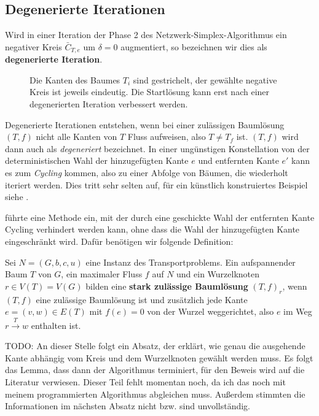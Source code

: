 \subsection{Degenerierte Iterationen}\label{ch:deg}

\begin{defn}Wird in einer Iteration der Phase 2 des Netzwerk-Simplex-Algorithmus ein negativer Kreis $\bar{C}_{T,e}$ um $\delta=0$ augmentiert, so bezeichnen wir dies als \textbf{degenerierte Iteration}.
\end{defn}

\begin{figure}[!ht]\centering
	
	\caption{Die Kanten des Baumes $T_i$ sind gestrichelt, der gewählte negative Kreis ist jeweils eindeutig. Die Startlösung kann erst nach einer degenerierten Iteration verbessert werden.}
	\label{fig:deg}
\end{figure}

Degenerierte Iterationen entstehen, wenn bei einer zulässigen Baumlösung $(T,f)$ nicht alle Kanten von $T$ Fluss aufweisen, also $T\neq T_f$ ist. $(T,f)$ wird dann auch als \emph{degeneriert} bezeichnet. In einer ungünstigen Konstellation von der deterministischen Wahl der hinzugefügten Kante $e$ und entfernten Kante $e'$ kann es zum \emph{Cycling} kommen, also zu einer Abfolge von Bäumen, die wiederholt iteriert werden. Dies tritt sehr selten auf, für ein künstlich konstruiertes Beispiel siehe \cite[S. 303]{NSAbook}.

\cite[Cunningham, 1976]{cycling} führte eine Methode ein, mit der durch eine geschickte Wahl der entfernten Kante Cycling verhindert werden kann, ohne dass die Wahl der hinzugefügten Kante eingeschränkt wird. Dafür benötigen wir folgende Definition:

\begin{defn}Sei $N=(G,b,c,u)$ eine Instanz des Transportproblems. Ein aufspannender Baum $T$ von $G$, ein maximaler Fluss $f$ auf $N$ und ein Wurzelknoten $r\in V(T)=V(G)$ bilden eine \textbf{stark zulässige Baumlösung} $(T,f)_r$, wenn $(T,f)$ eine zulässige Baumlösung ist und zusätzlich jede Kante $e=(v,w)\in E(T)$ mit $f(e)=0$ von der Wurzel weggerichtet, also $e$ im Weg $r\xrightarrow{T}w$ enthalten ist.\end{defn}

TODO: An dieser Stelle folgt ein Absatz, der erklärt, wie genau die ausgehende Kante abhängig vom Kreis und dem Wurzelknoten gewählt werden muss. Es folgt das Lemma, dass dann der Algorithmus terminiert, für den Beweis wird auf die Literatur verwiesen. Dieser Teil fehlt momentan noch, da ich das noch mit meinem programmierten Algorithmus abgleichen muss. Außerdem stimmten die Informationen im nächsten Absatz nicht bzw. sind unvollständig.

